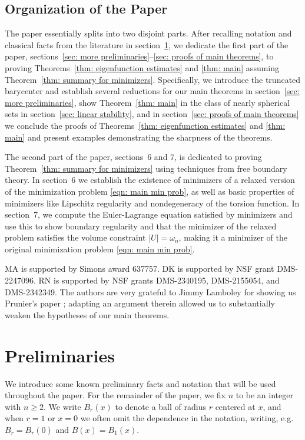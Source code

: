 \documentclass[10pt,a4paper]{amsart}
\numberwithin{equation}{section}
\def\om{\omega}
\providecommand{\href}[2]{#2}
\begin{document}
\subsection*{Organization of the Paper}

The paper  essentially splits into two disjoint parts. After recalling notation and classical facts from the literature in section~\ref{sec: prelim},  we dedicate the first part of the paper, sections~\ref{sec: more preliminaries}--\ref{sec: proofs of main theorems}, to proving Theorems~\ref{thm: eigenfunction estimates} and \ref{thm: main} assuming Theorem~\ref{thm: summary for minimizers}. Specifically, we introduce the truncated barycenter and establish several reductions for our main theorems in section~\ref{sec: more preliminaries}, show  Theorem~\ref{thm: main} in the class of nearly spherical sets in section~\ref{sec: linear stability}, and in section~\ref{sec: proofs of main theorems} we conclude the proofs of Theorems~\ref{thm: eigenfunction estimates} and \ref{thm: main} and present examples demonstrating the sharpness of the theorems. 

The second part of the paper, sections~\href{https://arxiv.org/abs/2504.13053v2}{6} and \href{https://arxiv.org/abs/2504.13053v2}{7},  is dedicated to proving Theorem~\ref{thm: summary for minimizers} using techniques from  free boundary theory. In section~\href{https://arxiv.org/abs/2504.13053v2}{6} we establish the existence of minimizers of a relaxed version of the minimization problem \eqref{eqn: main min prob}, as well as basic properties of minimizers like Lipschitz regularity and nondegeneracy of the torsion function. In section~\href{https://arxiv.org/abs/2504.13053v2}{7}, we compute the Euler-Lagrange equation satisfied by minimizers and use this to show boundary regularity and that the minimizer of the relaxed problem satisfies the volume constraint $|U| =\om_n$, making it a minimizer of the original minimization problem \eqref{eqn: main min prob}.  
% 
\medskip


 MA is supported by Simons award 637757.
DK is supported by NSF grant DMS-2247096.
RN is supported by NSF grants DMS-2340195, DMS-2155054, and DMS-2342349. The authors are very grateful to Jimmy Lamboley for showing us Prunier's paper \cite{p24}; adapting an argument therein allowed us to substantially weaken the hypotheses of our main theorems.

\section{Preliminaries}\label{sec: prelim}
We introduce some known preliminary facts and notation that will be used throughout the paper. For the remainder of the paper, we fix $n$ to be an integer with $n\geq 2.$
 We write $B_r(x)$ to denote a ball of radius $r$ centered at $x$, and when $r=1$ or $x=0$ we often omit the dependence in the notation, writing, e.g. $B_r = B_r(0)$ and $B(x) = B_1(x).$
\end{document}
